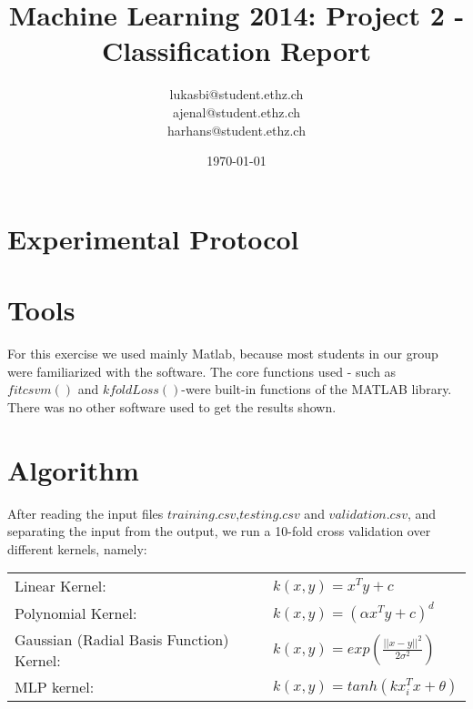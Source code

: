 \documentclass[a4paper, 11pt]{article}
\title{Machine Learning 2014: Project 2 - Classification Report}
\author{lukasbi@student.ethz.ch\\ ajenal@student.ethz.ch\\ harhans@student.ethz.ch\\}
\date{\today}
\begin{document}
\maketitle

\section*{Experimental Protocol}

\section{Tools}

For this exercise we used mainly Matlab, because most students in our group were familiarized with the software. The core functions used - such as $fitcsvm()$ and $kfoldLoss()$-were built-in functions of the MATLAB library. 
There was no other software used to get the results shown.


\section{Algorithm}
After reading the input files $training.csv$,$testing.csv$ and $validation.csv$, and separating the input from the output, we run a 10-fold cross validation over different kernels, namely:

\begin{table}[h]

\centering

\begin{tabular}{l l}
 
Linear Kernel: & $k(x,y) = x^Ty + c$ \\

Polynomial Kernel: & $k(x,y) = (\alpha x^Ty + c)^d$ \\

Gaussian (Radial Basis Function) Kernel: & $k(x,y) = exp(\frac{ ||x-y||^2}{2 \sigma ^2} )$ \\

MLP kernel: & $k(x,y) = tanh( k x^T_ix+\theta)$

\end{tabular}

\end{table}
\end{document}
